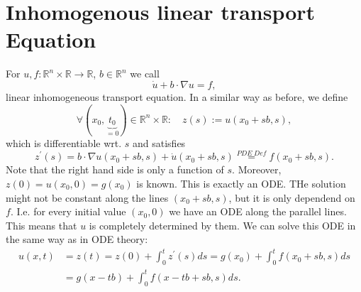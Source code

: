 \documentclass[A4,12pt,twoside]{book}
\begin{document}
\section{Inhomogenous linear transport Equation}
For $u,f : \mathbb{R}^n \times \mathbb{R} \to \mathbb{R}$, $b \in \mathbb{R}^n$ we call 
\[
\dot{u} + b \cdot \nabla u =f ,
\]
linear inhomogeneous transport equation. In a similar way as before, we define 
\[
\forall (x_0,\underbrace{t_0}_{=0}) \in \mathbb{R}^n \times \mathbb{R}: \quad z(s):= u(x_0 +sb,s),
\]
which is differentiable wrt. $s$ and satisfies 
\[
z^\prime (s) = b \cdot \nabla u(x_0 +sb,s)+ \dot{u}(x_0 +sb,s) \stackrel{PDE \; Def}{=} f(x_0 + sb,s).
\]
Note that the right hand side is only a function of $s$. Moreover, $z(0) = u(x_0,0)=g(x_0)$ is known. This is exactly an ODE. THe solution might not be constant along the lines $(x_0 + sb,s)$, but it is only dependend on $f$. I.e. for every initial value $(x_0,0)$ we have an ODE along the parallel lines. This means that $u$ is completely determined by them. We can solve this ODE in the same way as in ODE theory: 
\begin{align*}
    u(x,t) &= z(t) = z(0) + \int_0^t z^\prime (s) ds = g(x_0) + \int_0^t f(x_0 + sb,s) ds \\
    &= g(x-tb) + \int_0^t f(x-tb+sb,s) ds.
\end{align*}
\end{document}
